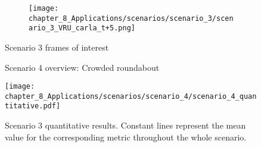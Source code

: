 \begin{figure}[]
\begin{subfigure}{0.42\textwidth}
		\caption{}
		\label{subfig:chapter_8_Applications/scenarios/scenario_3/scenario_3_VRU_rviz_t}
	\end{subfigure}
	\begin{subfigure}{0.42\textwidth}
		\texttt{[image: chapter\_8\_Applications/scenarios/scenario\_3/scenario\_3\_VRU\_carla\_t+5.png]}
		\caption{}
		\label{subfig:chapter_8_Applications/scenarios/scenario_3/scenario_3_VRU_carla_t+5}
	\end{subfigure}
	\hfill
	\begin{subfigure}{0.42\textwidth}
		\caption{}
		\label{subfig:chapter_8_Applications/scenarios/scenario_3/scenario_3_VRU_rviz_t+5}
	\end{subfigure}
	\caption{Scenario 3 frames of interest}
	\label{fig:chapter_8_Applications/scenarios/scenario_3_frames_of_interest}
\end{figure}


\begin{figure}[]
	\centering
	\caption{Scenario 4 overview: Crowded roundabout}
	\label{fig:chapter_8_Applications/scenarios/scenario_4/scenario_4_route_27_town03_training}
\end{figure}

\begin{figure}[]
	\centering
	\texttt{[image: chapter\_8\_Applications/scenarios/scenario\_4/scenario\_4\_quantitative.pdf]}
	\caption[Scenario 4 quantitative results]{Scenario 3 quantitative results. Constant lines represent the mean value for the corresponding metric throughout the whole scenario.}
	\label{fig:chapter_8_Applications/scenarios/scenario_4/scenario_4_quantitative}
\end{figure}

